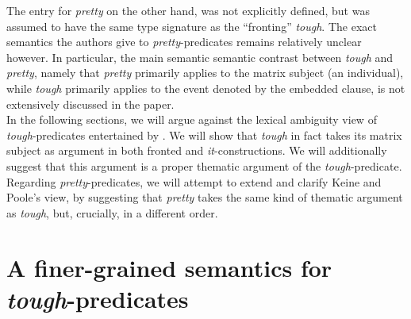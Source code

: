 \documentclass[11pt]{article}
\begin{document}
	
The entry for \textit{pretty} on the other hand, was not explicitly defined, but was assumed to have the same type signature as the ``fronting'' \textit{tough}. The exact semantics the authors give to \textit{pretty}-predicates remains relatively unclear however. In particular, the main semantic semantic contrast between \textit{tough} and \textit{pretty}, namely that \textit{pretty} primarily applies to the matrix subject (an individual), while \textit{tough} primarily applies to the event denoted by the embedded clause, is not extensively discussed in the paper.\\
	
In the following sections, we will argue against the lexical ambiguity view of \textit{tough}-predicates entertained by \cite{Keine2017}. We will show that \textit{tough} in fact takes its matrix subject as argument in both fronted and \textit{it}-constructions. We will additionally suggest that this argument is a proper thematic argument of the \textit{tough}-predicate. Regarding \textit{pretty}-predicates, we will attempt to extend and clarify Keine and Poole's view, by suggesting that \textit{pretty} takes the same kind of thematic argument as \textit{tough}, but, crucially, in a different order. 
		

\section{A finer-grained semantics for \textit{tough}-predicates}\label{sec:semantics-tough}
\end{document}
